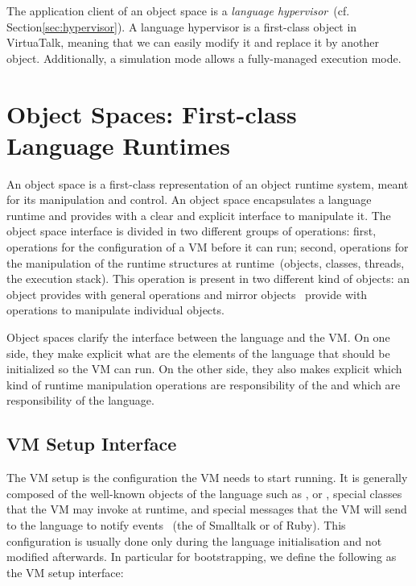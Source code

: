 The application client of an object space is a \emph{language hypervisor}~(cf. Section\ref{sec:hypervisor}). A language hypervisor is a first-class object in VirtuaTalk, meaning that we can easily modify it and replace it by another object. Additionally, a simulation mode allows a fully-managed execution mode.



\section{Object Spaces: First-class Language Runtimes} \label{sec:object_space}

An object space is a first-class representation of an object runtime system, meant for its manipulation and control. An object space encapsulates a language runtime and provides with a clear and explicit interface to manipulate it. The object space interface is divided in two different groups of operations: first, operations for the configuration of a VM before it can run; second, operations for the manipulation of the runtime structures at runtime~(objects, classes, threads, the execution stack). This operation is present in two different kind of objects: an  object provides with general operations and mirror objects~\cite{Brac04b} provide with operations to manipulate individual objects.

Object spaces clarify the interface between the language and the VM. On one side, they make explicit what are the elements of the language that should be initialized so the VM can run. On the other side, they also makes explicit which kind of runtime manipulation operations are responsibility of the \VM and which are responsibility of the language.

\subsection{VM Setup Interface}

The VM setup is the configuration the VM needs to start running. It is generally composed of the well-known objects of the language such as ,  or , special classes that the VM may invoke at runtime, and special messages that the VM will send to the language to notify events ~(\eg the  of Smalltalk or  of Ruby). This configuration is usually done only during the language initialisation and not modified afterwards. In particular for bootstrapping, we define the following as the VM setup interface:

